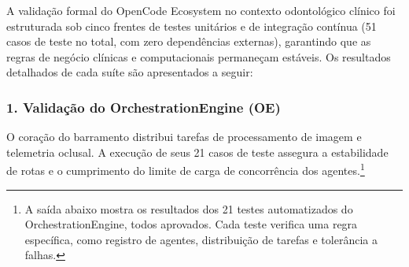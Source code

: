 A validação formal do OpenCode Ecosystem no contexto odontológico clínico foi estruturada sob cinco frentes de testes unitários e de integração contínua (51 casos de teste no total, com zero dependências externas), garantindo que as regras de negócio clínicas e computacionais permaneçam estáveis. Os resultados detalhados de cada suíte são apresentados a seguir:

\subsubsection*{1. Validação do OrchestrationEngine (OE)}

O coração do barramento distribui tarefas de processamento de imagem e telemetria oclusal. A execução de seus 21 casos de teste assegura a estabilidade de rotas e o cumprimento do limite de carga de concorrência dos agentes.\footnote{A saída abaixo mostra os resultados dos 21 testes automatizados do OrchestrationEngine, todos aprovados. Cada teste verifica uma regra específica, como registro de agentes, distribuição de tarefas e tolerância a falhas.}


